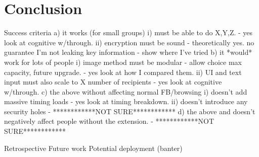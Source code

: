 \chapter{Conclusion}\label{ch:conclusion}

	Success criteria
		a) it works (for small groups)
			i) must be able to do X,Y,Z. - yes look at cognitive w/through.
			ii) encryption must be sound
				- theoretically yes. no guarantee I'm not leaking key information
				- show where I've tried
		b) it *would* work for lots of people
			i) image method must be modular - allow choice max capacity, future upgrade. - yes look at how I compared them.
			ii) UI and text input must also scale to X number of recipients - yes look at cognitive w/through.
		c) the above without affecting normal FB/browsing
			i) doesn't add massive timing loads - yes look at timing breakdown.
			ii) doesn't introduce any security holes - ************NOT SURE************
		d) the above and doesn't negatively affect people without the extension. - ************NOT SURE************

	Retrospective
	Future work
	Potential deployment (banter)
